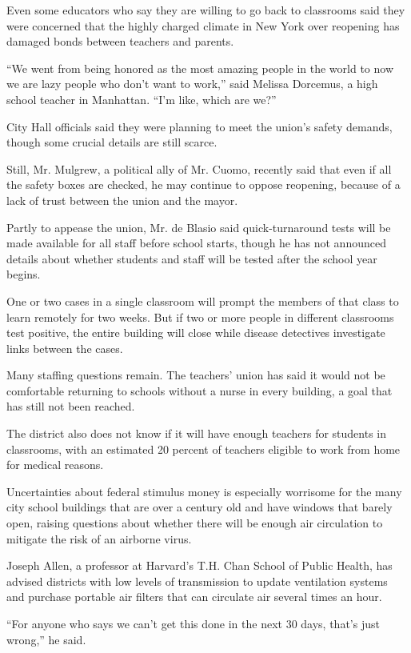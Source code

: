 Even some educators who say they are willing to go back to classrooms
said they were concerned that the highly charged climate in New York
over reopening has damaged bonds between teachers and parents.

``We went from being honored as the most amazing people in the world to
now we are lazy people who don't want to work,'' said Melissa Dorcemus,
a high school teacher in Manhattan. ``I'm like, which are we?''

City Hall officials said they were planning to meet the union's safety
demands, though some crucial details are still scarce.

Still, Mr. Mulgrew, a political ally of Mr. Cuomo, recently said that
even if all the safety boxes are checked, he may continue to oppose
reopening, because of a lack of trust between the union and the mayor.

Partly to appease the union, Mr. de Blasio said quick-turnaround tests
will be made available for all staff before school starts, though he has
not announced details about whether students and staff will be tested
after the school year begins.

One or two cases in a single classroom will prompt the members of that
class to learn remotely for two weeks. But if two or more people in
different classrooms test positive, the entire building will close while
disease detectives investigate links between the cases.

Many staffing questions remain. The teachers' union has said it would
not be comfortable returning to schools without a nurse in every
building, a goal that has still not been reached.

The district also does not know if it will have enough teachers for
students in classrooms, with an estimated 20 percent of teachers
eligible to work from home for medical reasons.

Uncertainties about federal stimulus money is especially worrisome for
the many city school buildings that are over a century old and have
windows that barely open, raising questions about whether there will be
enough air circulation to mitigate the risk of an airborne virus.

Joseph Allen, a professor at Harvard's T.H. Chan School of Public
Health, has advised districts with low levels of transmission to update
ventilation systems and purchase portable air filters that can circulate
air several times an hour.

``For anyone who says we can't get this done in the next 30 days, that's
just wrong,'' he said.

